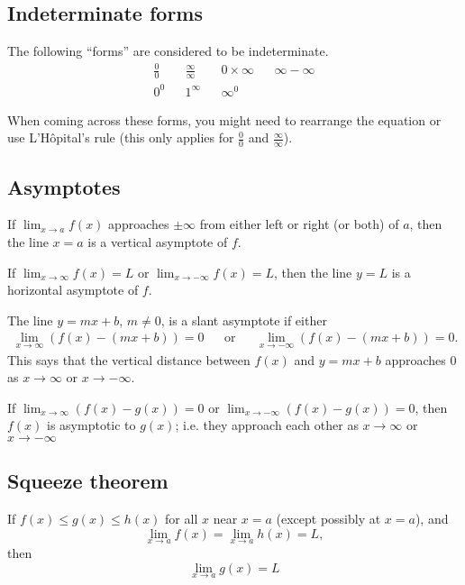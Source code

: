 \documentclass[main.tex]{subfiles}
\begin{document}
\begin{multicols}{2}
	\subsection*{Indeterminate forms}
	The following ``forms'' are considered to be indeterminate.
	\begin{align*}
		\frac{0}{0} && \frac{\infty}{\infty} && 0 \times \infty && \infty - \infty\\
		0^0 && 1^\infty && \infty^0
	\end{align*}

	When coming across these forms, you might need to rearrange the equation or use L'Hôpital's rule (this only applies for \(\frac{0}{0}\) and \(\frac{\infty}{\infty}\)).

	\subsection*{Asymptotes}
	\begin{definition}
		If \(\lim_{x \to a}{f(x)}\) approaches \(\pm \infty\) from either left or right (or both) of \(a\), then the line \(x = a\) is a vertical asymptote of \(f\).
	\end{definition}
	\begin{definition}
		If \(\lim_{x \to \infty}{f(x)} = L\) or \(\lim_{x \to -\infty}{f(x)} = L\), then the line \(y = L\) is a horizontal asymptote of \(f\).
	\end{definition}
	\begin{definition}
		The line \(y = mx + b\), \(m \neq 0\), is a slant asymptote if either
		\[
			\begin{aligned}
			\lim_{x \to \infty} (f(x) - (mx + b)) = 0 && \text{or} && \lim_{x \to -\infty} (f(x) - (mx + b)) = 0.
			\end{aligned}
		\]
		This says that the vertical distance between \(f(x)\) and \(y = mx + b\) approaches 0 as \(x \to \infty\) or \(x \to -\infty\).
	\end{definition}
	\begin{definition}
	If \(\lim_{x \to \infty} (f(x) - g(x)) = 0\) or \(\lim_{x \to -\infty} (f(x) - g(x)) = 0\), then \(f(x)\) is asymptotic to \(g(x)\); i.e. they approach each other as \(x \to \infty\) or \(x \to -\infty\)
	\end{definition}

	\subsection*{Squeeze theorem}
	\begin{theorem}
	If \(f(x) \leq g(x) \leq h(x)\) for all \(x\) near \(x = a\) (except possibly at \(x = a\)), and
	\[\lim_{x \to a}{f(x)} = \lim_{x \to a}{h(x)} = L,\] then \[\lim_{x \to a}{g(x)} = L\]
	\end{theorem}


\end{multicols}
\end{document}
